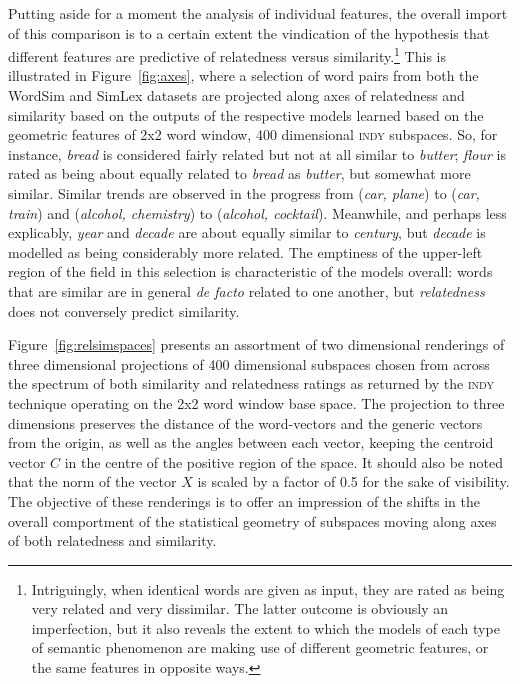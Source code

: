 Putting aside for a moment the analysis of individual features, the overall import of this comparison is to a certain extent the vindication of the hypothesis that different features are predictive of relatedness versus similarity.\footnote{Intriguingly, when identical words are given as input, they are rated as being very related and very dissimilar.  The latter outcome is obviously an imperfection, but it also reveals the extent to which the models of each type of semantic phenomenon are making use of different geometric features, or the same features in opposite ways.}  This is illustrated in Figure~\ref{fig:axes}, where a selection of word pairs from both the WordSim and SimLex datasets are projected along axes of relatedness and similarity based on the outputs of the respective models learned based on the geometric features of 2x2 word window, 400 dimensional \textsc{indy} subspaces.  So, for instance, \emph{bread} is considered fairly related but not at all similar to \emph{butter}; \emph{flour} is rated as being about equally related to \emph{bread} as \emph{butter}, but somewhat more similar.  Similar trends are observed in the progress from (\emph{car, plane}) to (\emph{car, train}) and (\emph{alcohol, chemistry}) to (\emph{alcohol, cocktail}).  Meanwhile, and perhaps less explicably, \emph{year} and \emph{decade} are about equally similar to \emph{century}, but \emph{decade} is modelled as being considerably more related.  The emptiness of the upper-left region of the field in this selection is characteristic of the models overall: words that are similar are in general \emph{de facto} related to one another, but \emph{relatedness} does not conversely predict similarity.

Figure~\ref{fig:relsimspaces} presents an assortment of two dimensional renderings of three dimensional projections of 400 dimensional subspaces chosen from across the spectrum of both similarity and relatedness ratings as returned by the \textsc{indy} technique operating on the 2x2 word window base space.  The projection to three dimensions preserves the distance of the word-vectors and the generic vectors from the origin, as well as the angles between each vector, keeping the centroid vector $C$ in the centre of the positive region of the space.  It should also be noted that the norm of the vector $X$ is scaled by a factor of 0.5 for the sake of visibility.  The objective of these renderings is to offer an impression of the shifts in the overall comportment of the statistical geometry of subspaces moving along axes of both relatedness and similarity.

